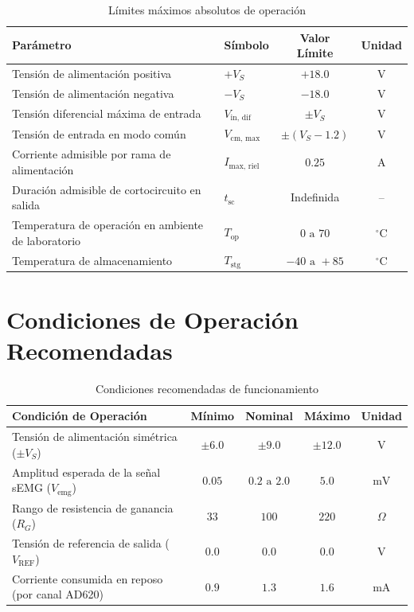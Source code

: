 \documentclass[10pt,a4paper]{article}
\begin{document}
\begin{table}[H]
    \centering
    \caption{Límites máximos absolutos de operación}
    \label{tab:limites_maximos}
    \begin{tabular}{llcc}
        \toprule
        \textbf{Parámetro} & \textbf{Símbolo} & \textbf{Valor Límite} & \textbf{Unidad} \\
        \midrule
        Tensión de alimentación positiva & $+V_{S}$ & $+18.0$ & $\text{V}$ \\
        Tensión de alimentación negativa & $-V_{S}$ & $-18.0$ & $\text{V}$ \\
        Tensión diferencial máxima de entrada & $V_{\text{in, dif}}$ & $\pm V_{S}$ & $\text{V}$ \\
        Tensión de entrada en modo común & $V_{\text{cm, max}}$ & $\pm (V_S - 1.2)$ & $\text{V}$ \\
        Corriente admisible por rama de alimentación & $I_{\text{max, riel}}$ & $0.25$ & $\text{A}$ \\
        Duración admisible de cortocircuito en salida & $t_{\text{sc}}$ & Indefinida & -- \\
        Temperatura de operación en ambiente de laboratorio & $T_{\text{op}}$ & $0\text{ a }70$ & $^\circ\text{C}$ \\
        Temperatura de almacenamiento & $T_{\text{stg}}$ & $-40\text{ a }+85$ & $^\circ\text{C}$ \\
        \bottomrule
    \end{tabular}
\end{table}

\section{Condiciones de Operación Recomendadas}

\begin{table}[H]
    \centering
    \caption{Condiciones recomendadas de funcionamiento}
    \label{tab:condiciones_recomendadas}
    \begin{tabular}{lcccc}
        \toprule
        \textbf{Condición de Operación} & \textbf{Mínimo} & \textbf{Nominal} & \textbf{Máximo} & \textbf{Unidad} \\
        \midrule
        Tensión de alimentación simétrica ($\pm V_S$) & $\pm 6.0$ & $\pm 9.0$ & $\pm 12.0$ & $\text{V}$ \\
        Amplitud esperada de la señal sEMG ($V_{\text{emg}}$) & $0.05$ & $0.2\text{ a }2.0$ & $5.0$ & $\text{mV}$ \\
        Rango de resistencia de ganancia ($R_G$) & $33$ & $100$ & $220$ & $\Omega$ \\
        Tensión de referencia de salida ($V_{\text{REF}}$) & $0.0$ & $0.0$ & $0.0$ & $\text{V}$ \\
        Corriente consumida en reposo (por canal AD620) & $0.9$ & $1.3$ & $1.6$ & $\text{mA}$ \\
        \bottomrule
    \end{tabular}
\end{table}
\end{document}
